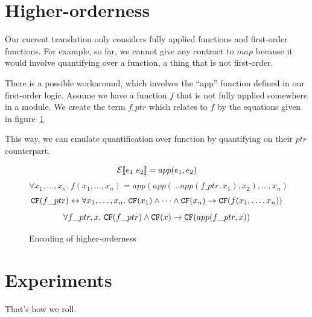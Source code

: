 \documentclass[preprint]{sigplanconf}
\begin{document}
\section{Higher-orderness}
\label{ho}
Our current translation only considers fully applied functions and
first-order functions. For example, so far, we cannot give any
contract to $map$ because it would involve quantifying over a
function, a thing that is not first-order.

There is a possible workaround, which involves the ``app'' function
defined in our first-order logic. Assume we have a function $f$ that
is not fully applied somewhere in a module. We create the term
$f\_ptr$ which relates to $f$ by the equations given in figure~\ref{ho-fig}

This way, we can emulate quantification over function by quantifying
on their $ptr$ counterpart.


\begin{figure}
$$\mathcal{E} \llbracket e_1~e_2 \rrbracket = app(e_1,e_2)$$
$$ \forall x_1,\dots,x_n.~f(x_1,\dots,x_n) = app(app(\dots app(f\_ptr,x_1),x_2),\dots,x_n)$$
$$ \texttt{CF}(f\_ptr) \leftrightarrow \forall x_1,\dots,x_n.~\texttt{CF}(x_1) \land \dots \land \texttt{CF}(x_n) \to \texttt{CF}(f(x_1,\dots,x_n))$$
$$\forall f\_ptr,x.~\texttt{CF}(f\_ptr) \land \texttt{CF}(x) \to \texttt{CF}(app(f\_ptr,x))$$
\caption{Encoding of higher-orderness}
\label{ho-fig}
\end{figure}

\section{Experiments}
That's how we roll.
\end{document}
